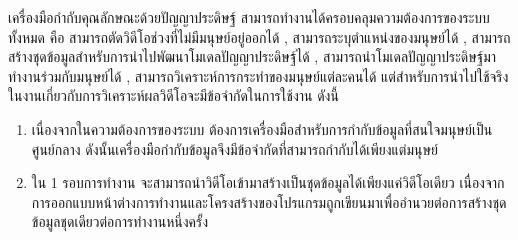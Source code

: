 เครื่องมือกำกับคุณลักษณะด้วยปัญญาประดิษฐ์ สามารถทำงานได้ครอบคลุมความต้องการของระบบทั้งหมด คือ สามารถตัดวิดีโอช่วงที่ไม่มีมนุษย์อยู่ออกได้ , สามารถระบุตำแหน่งของมนุษย์ได้ , สามารถสร้างชุดข้อมูลสำหรับการนำไปพัฒนาโมเดลปัญญาประดิษฐ์ได้ , สามารถนำโมเดลปัญญาประดิษฐ์มาทำงานร่วมกับมนุษย์ได้ , สามารถวิเคราะห์การกระทำของมนุษย์แต่ละคนได้ แต่สำหรับการนำไปใช้จริงในงานเกี่ยวกับการวิเคราะห์ผลวิดีโอจะมีข้อจำกัดในการใช้งาน ดังนี้
\begin{enumerate}
	\item เนื่องจากในความต้องการของระบบ ต้องการเครื่องมือสำหรับการกำกับข้อมูลที่สนใจมนุษย์เป็นศูนย์กลาง ดังนั้นเครื่องมือกำกับข้อมูลจึงมีข้อจำกัดที่สามารถกำกับได้เพียงแต่มนุษย์
	\item ใน 1 รอบการทำงาน จะสามารถนำวิดีโอเข้ามาสร้างเป็นชุดข้อมูลได้เพียงแค่วิดีโอเดียว เนื่องจาก การออกแบบหน้าต่างการทำงานและโครงสร้างของโปรแกรมถูกเขียนมาเพื่ออำนวยต่อการสร้างชุดข้อมูลชุดเดียวต่อการทำงานหนึ่งครั้ง
\end{enumerate}	